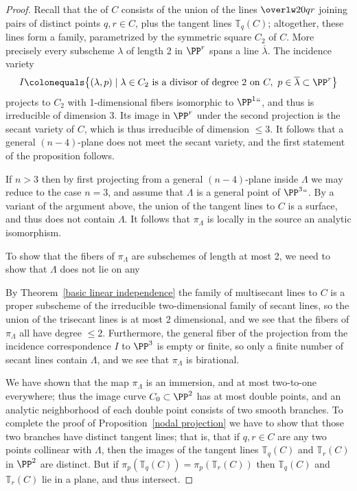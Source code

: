\begin{proof} Recall that the 
%
of $C$ consists of the
union of the lines $\overlw20{qr}$ joining pairs of distinct points
$q,r \in C$, plus the tangent lines ${\mathbb T}_q(C)$; altogether,
these lines form a family, parametrized by the symmetric square $C_2$
of $C$. More precisely every subscheme $\lambda$ of
length 2 in $\PP^r$ spans a line $\overline \lambda$. The incidence
variety
$$
I\colonequals \bigl\{(\lambda, p)\mid \lambda\in C_2 \hbox{ is a divisor of
degree 2 on }C,\ p\in \overline \lambda\subset\PP^r\bigr\}
$$
projects to $C_2$ with 1-dimensional fibers isomorphic to $\PP^1` `$,
and thus
is irreducible of dimension 3. Its image in $\PP^r$ under the second
projection
is the secant variety of $C$, which is thus irreducible of dimension
$\leq 3$.
It follows that a general
$(n-4)$-plane does not meet the secant variety, and the first statement
of the proposition follows.

If $n>3$ then by first projecting from a general $(n-4)$-plane inside
$\Lambda$ we may reduce to the case $n=3$, and assume that $\Lambda$ is a
general point of $\PP^3` `$. By a variant of the argument above, the union
of the tangent lines to $C$ is a surface, and thus does not contain
$\Lambda$.
It follows that $\pi_\Lambda$ is locally in the source an analytic
isomorphism.

To show that the fibers of $\pi_\Lambda$ are subschemes of length at
most 2,
we need to show that $\Lambda$ does not lie on any 
%

By Theorem~\ref{basic linear independence} the family of multisecant
lines to $C$ is a proper subscheme of the irreducible two-dimensional
family of secant lines, so the union of the trisecant lines is at most 2
dimensional, and we see that the fibers of $\pi_\Lambda$ all have degree
$\leq 2$. Furthermore, the general fiber of the projection
from the incidence correspondence $I$ to $\PP^3$ is empty or finite,
so only a finite number of secant lines contain $\Lambda$, and we see
that $\pi_\Lambda$ is birational.

We have shown that the map $\pi_\Lambda$ is an immersion, and at
most two-to-one everywhere; thus the image curve $C_0 \subset \PP^2$
has at most double points, and an analytic neighborhood of each
double point  consists of two smooth branches. To complete the proof
of Proposition~\ref{nodal projection} we have to show that those two
branches have distinct tangent lines; that is, that
if $q, r \in C$ are any two points collinear with $\Lambda$, then the
images of the tangent lines ${\mathbb T}_q(C)$ and ${\mathbb T}_r(C)$ in
$\PP^2$ are distinct. But if  $\pi_p({\mathbb T}_q(C)) = \pi_p({\mathbb
T}_r(C))$ then  ${\mathbb T}_q(C)$ and ${\mathbb T}_r(C)$ lie in a plane,
and thus intersect.


\end{proof}
